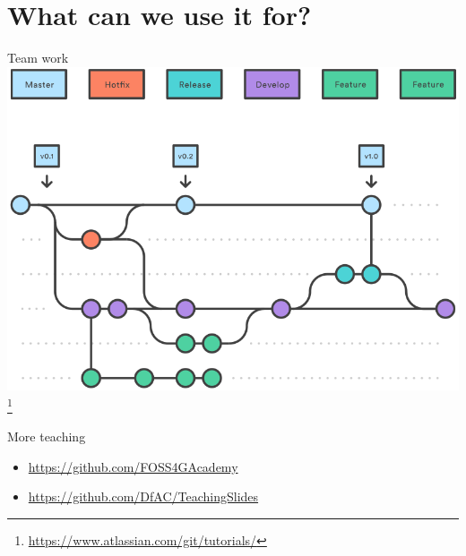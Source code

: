 \documentclass[11pt]{beamer}
\begin{document}


\section{What can we use it for?}



\begin{frame}{Team work}
\centering
\includegraphics[height=.7\textheight]{pic/Git_flow.png} \footnote{\url{https://www.atlassian.com/git/tutorials/}}
\end{frame}

\begin{frame}{More teaching}

\begin{itemize}
	\item \url{https://github.com/FOSS4GAcademy}
	\item \url{https://github.com/DfAC/TeachingSlides}
\end{itemize}
\end{frame}
\end{document}
